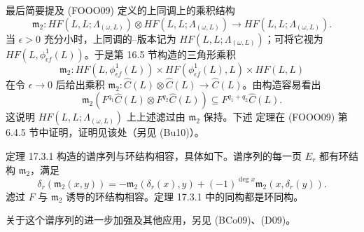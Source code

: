 最后简要提及 (FOOO09) 定义的\personFloer{}上同调上的乘积结构
\[
 \mathfrak m_2:HF(L,L;\Lambda_{(\omega,L)})\otimes
 HF(L,L;\Lambda_{(\omega,L)})\to HF(L,L;\Lambda_{(\omega,L)}).
\]
当 $\epsilon>0$ 充分小时，\personFloer{}上同调的\personMorse{}--\personBott{}版本记为
$HF(L,L;\Lambda_{(\omega,L)})$；可将它视为 $HF(L,\phi_{\epsilon f}^1(L))$。于是第
16.5 节构造的三角形乘积
\[
 \mathfrak m_2:HF(L,\phi_{\epsilon f}^1(L))\times
 HF(\phi_{\epsilon f}^1(L),L)\times HF(L,L)
\]
在令 $\epsilon\to0$ 后给出乘积
$\mathfrak m_2:\widehat C(L)\otimes\widehat C(L)\to\widehat C(L)$。由构造容易看出
\[
 \mathfrak m_2(F^{q_1}\widehat C(L)\otimes F^{q_2}\widehat C(L))
 \subseteq F^{q_1+q_2}\widehat C(L).
\]
这说明 $HF(L,L;\Lambda_{(\omega,L)})$ 上上述滤过由 $\mathfrak m_2$ 保持。下述
定理在 (FOOO09) 第 6.4.5 节中证明，证明见该处（另见 (Bu10)）。

\begin{theorem}
\label{thm:spectral-sequence-ring-compatible}
定理 17.3.1 构造的谱序列与环结构相容，具体如下。谱序列的每一页 $E_r$ 都有环结构
$\mathfrak m_2$，满足
\[
 \delta_r(\mathfrak m_2(x,y))
 =-\mathfrak m_2(\delta_r(x),y)
 +(-1)^{\deg x}\mathfrak m_2(x,\delta_r(y)).
\]
滤过 $F$ 与 $\mathfrak m_2$ 诱导的环结构相容。定理 17.3.1 中的同构都是环同构。
\end{theorem}

关于这个谱序列的进一步加强及其他应用，另见 (BCo09)、(D09)。

